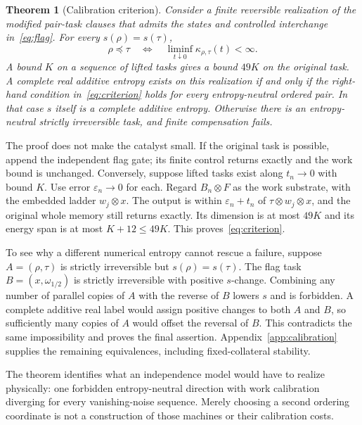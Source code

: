 \documentclass[11pt,a4paper]{article}
\newtheorem{theorem}{Theorem}
\begin{document}
\begin{theorem}[Calibration criterion]\label{thm:calibration}
Consider a finite reversible realization of the modified pair-task clauses that admits the states and controlled interchange in~\eqref{eq:flag}. For every $s(\rho)=s(\tau)$,
\begin{equation}
 \rho\preceq\tau\quad\Longleftrightarrow\quad
 \liminf_{t\downarrow0}\kappa_{\rho,\tau}(t)<\infty. \label{eq:criterion}
\end{equation}
A bound $K$ on a sequence of lifted tasks gives a bound $49K$ on the original task. A complete real additive entropy exists on this realization if and only if the right-hand condition in~\eqref{eq:criterion} holds for every entropy-neutral ordered pair. In that case $s$ itself is a complete additive entropy. Otherwise there is an entropy-neutral strictly irreversible task, and finite compensation fails.
\end{theorem}

The proof does not make the catalyst small. If the original task is possible, append the independent flag gate; its finite control returns exactly and the work bound is unchanged. Conversely, suppose lifted tasks exist along $t_n\to0$ with bound $K$. Use error $\varepsilon_n\to0$ for each. Regard $B_n\otimes F$ as the work substrate, with the embedded ladder $w_j\otimes x$. The output is within $\varepsilon_n+t_n$ of $\tau\otimes w_j\otimes x$, and the original whole memory still returns exactly. Its dimension is at most $49K$ and its energy span is at most $K+12\le49K$. This proves~\eqref{eq:criterion}.

To see why a different numerical entropy cannot rescue a failure, suppose $A=(\rho,\tau)$ is strictly irreversible but $s(\rho)=s(\tau)$. The flag task $B=(x,\omega_{1/2})$ is strictly irreversible with positive $s$-change. Combining any number of parallel copies of $A$ with the reverse of $B$ lowers $s$ and is forbidden. A complete additive real label would assign positive changes to both $A$ and $B$, so sufficiently many copies of $A$ would offset the reversal of $B$. This contradicts the same impossibility and proves the final assertion. Appendix~\ref{app:calibration} supplies the remaining equivalences, including fixed-collateral stability.

The theorem identifies what an independence model would have to realize physically: one forbidden entropy-neutral direction with work calibration diverging for every vanishing-noise sequence. Merely choosing a second ordering coordinate is not a construction of those machines or their calibration costs.
\end{document}
